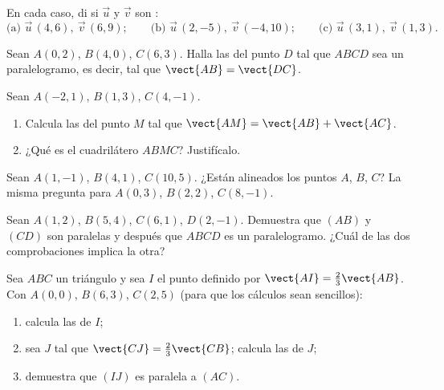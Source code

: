 \begin{exercise}[$\star$]\label{exo:g10:vectors:4}
En cada caso, di si $\vec u$ y $\vec v$ son :
\[
\text{(a) } \vec u\,(4, 6),\ \vec v\,(6, 9);
\qquad
\text{(b) } \vec u\,(2, -5),\ \vec v\,(-4, 10);
\qquad
\text{(c) } \vec u\,(3, 1),\ \vec v\,(1, 3).
\]
\end{exercise}

\begin{exercise}[$\star$]\label{exo:g10:vectors:5}
Sean $A(0, 2)$, $B(4, 0)$, $C(6, 3)$. Halla las  del punto $D$
tal que $ABCD$ sea un paralelogramo, es decir, tal que
$\vect{AB} = \vect{DC}$.
\end{exercise}

\begin{exercise}[$\star\star$]\label{exo:g10:vectors:6}
Sean $A(-2, 1)$, $B(1, 3)$, $C(4, -1)$.
\begin{enumerate}
  \item Calcula las  del punto $M$ tal que
        $\vect{AM} = \vect{AB} + \vect{AC}$.
  \item ¿Qué es el cuadrilátero $ABMC$? Justifícalo.
\end{enumerate}
\end{exercise}

\begin{exercise}[$\star\star$]\label{exo:g10:vectors:7}
Sean $A(1, -1)$, $B(4, 1)$, $C(10, 5)$. ¿Están alineados los puntos $A$,
$B$, $C$? La misma pregunta para $A(0, 3)$, $B(2, 2)$, $C(8, -1)$.
\end{exercise}

\begin{exercise}[$\star\star$]\label{exo:g10:vectors:8}
Sean $A(1, 2)$, $B(5, 4)$, $C(6, 1)$, $D(2, -1)$. Demuestra que $(AB)$ y
$(CD)$ son paralelas y después que $ABCD$ es un paralelogramo. ¿Cuál de
las dos comprobaciones implica la otra?
\end{exercise}

\begin{exercise}[$\star\star$]\label{exo:g10:vectors:9}
Sea $ABC$ un triángulo y sea $I$ el punto definido por
$\vect{AI} = \frac23 \vect{AB}$. Con $A(0,0)$, $B(6, 3)$, $C(2, 5)$ (para
que los cálculos sean sencillos):
\begin{enumerate}
  \item calcula las  de $I$;
  \item sea $J$ tal que $\vect{CJ} = \frac23\vect{CB}$; calcula las
         de $J$;
  \item demuestra que $(IJ)$ es paralela a $(AC)$.
\end{enumerate}
\end{exercise}

